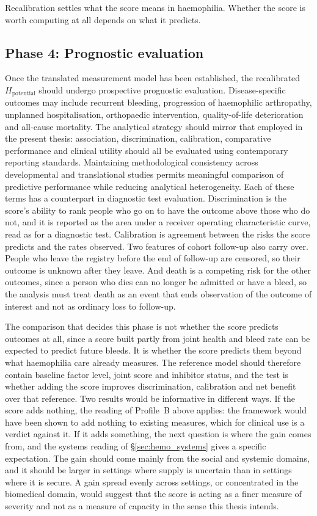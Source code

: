 Recalibration settles what the score means in haemophilia. Whether the score is
worth computing at all depends on what it predicts.


\subsection{Phase 4: Prognostic evaluation}

Once the translated measurement model has been established, the recalibrated $H_{\text{potential}}$ should undergo prospective prognostic evaluation. Disease-specific outcomes may include recurrent bleeding, progression of haemophilic arthropathy, unplanned hospitalisation, orthopaedic intervention, quality-of-life deterioration and all-cause mortality. The analytical strategy should mirror that employed in the present thesis: association, discrimination, calibration, comparative performance and clinical utility should all be evaluated using contemporary reporting standards. Maintaining methodological consistency across developmental and translational studies permits meaningful comparison of predictive performance while reducing analytical heterogeneity. Each of these terms has a counterpart in diagnostic test evaluation. Discrimination is the score's ability to rank people who go on to have the outcome above those who do not, and it is reported as the area under a receiver operating characteristic curve, read as for a diagnostic test. Calibration is agreement between the risks the score predicts and the rates observed. Two features of cohort follow-up also carry over. People who leave the registry before the end of follow-up are censored, so their outcome is unknown after they leave. And death is a competing risk for the other outcomes, since a person who dies can no longer be admitted or have a bleed, so the analysis must treat death as an event that ends observation of the outcome of interest and not as ordinary loss to follow-up.

The comparison that decides this phase is not whether the score predicts outcomes at all, since a score built partly from joint health and bleed rate can be expected to predict future bleeds. It is whether the score predicts them beyond what haemophilia care already measures. The reference model should therefore contain baseline factor level, joint score and inhibitor status, and the test is whether adding the score improves discrimination, calibration and net benefit over that reference. Two results would be informative in different ways. If the score adds nothing, the reading of Profile~B above applies: the framework would have been shown to add nothing to existing measures, which for clinical use is a verdict against it. If it adds something, the next question is where the gain comes from, and the systems reading of \S\ref{sec:hemo_systems} gives a specific expectation. The gain should come mainly from the social and systemic domains, and it should be larger in settings where supply is uncertain than in settings where it is secure. A gain spread evenly across settings, or concentrated in the biomedical domain, would suggest that the score is acting as a finer measure of severity and not as a measure of capacity in the sense this thesis intends.

